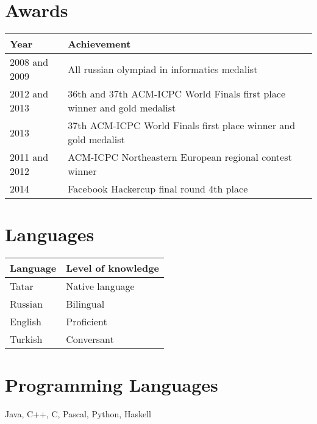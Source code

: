 \documentclass[11pt,a4paper,oneside]{article}
\begin{document}
\section{Awards}
\begin{center}
    \begin{tabular}{l|l}
        Year&Achievement \\
        \hline
        2008 and 2009& All russian olympiad in informatics medalist \\
        2012 and 2013 &36th and 37th ACM-ICPC World Finals first place winner and gold medalist \\
        2013&37th ACM-ICPC World Finals first place winner and gold medalist \\
        2011 and 2012&ACM-ICPC Northeastern European regional contest winner \\
        2014 & Facebook Hackercup final round 4th place
    \end{tabular}
\end{center}

\section{Languages}
\begin{center}  
    \begin{tabular}{l|l}
        Language&Level of knowledge \\
        \hline
        Tatar&Native language \\
        Russian&Bilingual \\ 
        English&Proficient \\
        Turkish&Conversant \\
    \end{tabular}
\end{center}
\section{Programming Languages}
    Java, C++, C, Pascal, Python, Haskell
\end{document}
